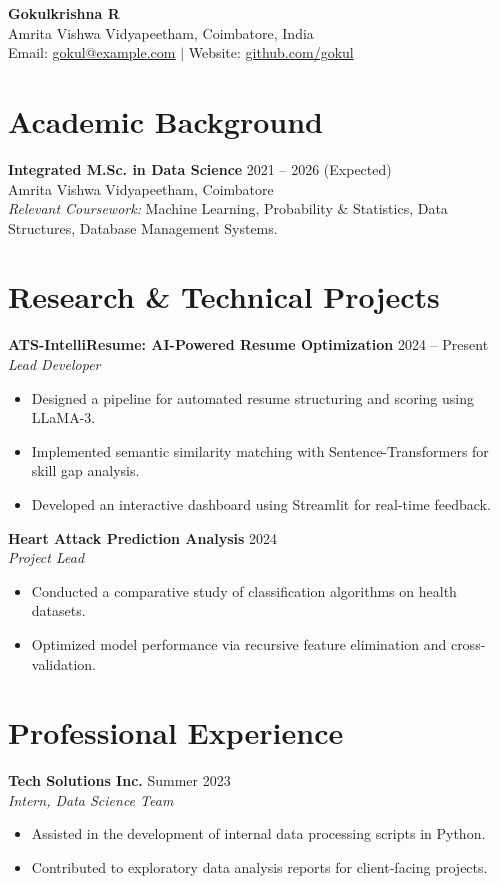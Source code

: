 \documentclass[11pt,a4paper]{article}
\begin{document}
\begin{center}
    {\LARGE \textbf{Gokulkrishna R}} \\ \vspace{5pt}
    Amrita Vishwa Vidyapeetham, Coimbatore, India \\
    Email: \href{mailto:gokul@example.com}{gokul@example.com} $|$ Website: \href{https://github.com/gokul}{github.com/gokul}
\end{center}

\section{Academic Background}
\textbf{Integrated M.Sc. in Data Science} \hfill 2021 -- 2026 (Expected) \\
Amrita Vishwa Vidyapeetham, Coimbatore \\
\textit{Relevant Coursework:} Machine Learning, Probability \& Statistics, Data Structures, Database Management Systems.

\section{Research \& Technical Projects}
\textbf{ATS-IntelliResume: AI-Powered Resume Optimization} \hfill 2024 -- Present \\
\textit{Lead Developer}
\begin{itemize}
    \item Designed a pipeline for automated resume structuring and scoring using LLaMA-3.
    \item Implemented semantic similarity matching with Sentence-Transformers for skill gap analysis.
    \item Developed an interactive dashboard using Streamlit for real-time feedback.
\end{itemize}

\textbf{Heart Attack Prediction Analysis} \hfill 2024 \\
\textit{Project Lead}
\begin{itemize}
    \item Conducted a comparative study of classification algorithms on health datasets.
    \item Optimized model performance via recursive feature elimination and cross-validation.
\end{itemize}

\section{Professional Experience}
\textbf{Tech Solutions Inc.} \hfill Summer 2023 \\
\textit{Intern, Data Science Team}
\begin{itemize}
    \item Assisted in the development of internal data processing scripts in Python.
    \item Contributed to exploratory data analysis reports for client-facing projects.
\end{itemize}
\end{document}
